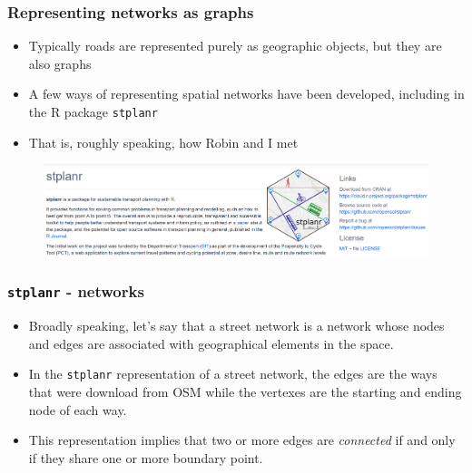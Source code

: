 \documentclass[c,10pt,pdftex]{beamer}
\begin{document}
\begin{frame}
  \frametitle{Representing networks as graphs}
  \vspace{-0.75cm}
  \begin{itemize}
    \setlength\itemsep{1em}
    \item Typically roads are represented purely as geographic objects, but they are also graphs
    \item A few ways of representing spatial networks have been developed, including in the R package \texttt{stplanr}
    \item That is, roughly speaking, how Robin and I met
  \end{itemize}
  \begin{figure}
  	\centering
  	\includegraphics[width = 1.05\linewidth]{images/stplanr-wide-screenshot}
  \end{figure}	
\end{frame}

% 

\begin{frame}
  \frametitle{\texttt{stplanr} - networks}
  \vspace{-0.75cm}
  \begin{itemize}
    \setlength\itemsep{1em}
    \item Broadly speaking, let's say that a street network is a network whose nodes and edges are associated with geographical elements in the space. 
    \item In the \texttt{stplanr} representation of a street network, the edges are the ways that were download from OSM while the vertexes are the starting and ending node of each way. 
    \item This representation implies that two or more edges are \textit{connected} if and only if they share one or more boundary point. 
  \end{itemize}
\end{frame}
\end{document}

